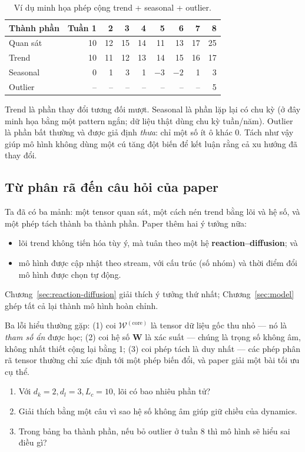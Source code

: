\begin{table}[htbp]
  \centering
  \small
  \caption{Ví dụ minh họa phép cộng trend + seasonal + outlier.}
  \label{tab:three-components}
  \begin{tabular}{lrrrrrrrr}
    \toprule
    Thành phần & Tuần 1 & 2 & 3 & 4 & 5 & 6 & 7 & 8 \\
    \midrule
    Quan sát      & 10 & 12 & 15 & 14 & 11 & 13 & 17 & 25 \\
    Trend         & 10 & 11 & 12 & 13 & 14 & 15 & 16 & 17 \\
    Seasonal      &  0 &  1 &  3 &  1 & $-3$ & $-2$ &  1 &  3 \\
    Outlier       &  -- & -- & -- & -- & -- & -- & -- &  5 \\
    \bottomrule
  \end{tabular}
\end{table}

Trend là phần thay đổi tương đối mượt. Seasonal là phần lặp lại có chu kỳ (ở đây minh họa bằng
một pattern ngắn; dữ liệu thật dùng chu kỳ tuần/năm). Outlier là phần bất thường và được giả định
\emph{thưa}: chỉ một số ít ô khác 0. Tách như vậy giúp mô hình không dùng một cú tăng đột biến
để kết luận rằng cả xu hướng đã thay đổi.

\subsection{Từ phân rã đến câu hỏi của paper}

Ta đã có ba mảnh: một tensor quan sát, một cách nén trend bằng lõi và hệ số, và một phép tách
thành ba thành phần. Paper thêm hai ý tưởng nữa:
\begin{itemize}
  \item lõi trend không tiến hóa tùy ý, mà tuân theo một hệ \textbf{reaction--diffusion}; và
  \item mô hình được cập nhật theo stream, với cấu trúc (số nhóm) và thời điểm đổi mô hình được
        chọn tự động.
\end{itemize}
Chương~\ref{sec:reaction-diffusion} giải thích ý tưởng thứ nhất; Chương~\ref{sec:model} ghép tất
cả lại thành mô hình hoàn chỉnh.

\begin{commonmistake}
Ba lỗi hiểu thường gặp: (1) coi $\mathcal{W}^{(\mathrm{core})}$ là tensor dữ liệu gốc thu nhỏ ---
nó là \emph{tham số ẩn} được học; (2) coi hệ số $\mathbf{W}$ là xác suất --- chúng là trọng số
không âm, không nhất thiết cộng lại bằng 1; (3) coi phép tách là duy nhất --- các phép phân rã
tensor thường chỉ xác định tới một phép biến đổi, và paper giải một bài tối ưu cụ thể.
\end{commonmistake}

\begin{selfcheck}
\begin{enumerate}
  \item Với $d_k=2,d_l=3,L_c=10$, lõi có bao nhiêu phần tử?
  \item Giải thích bằng một câu vì sao hệ số không âm giúp giữ chiều của dynamics.
  \item Trong bảng ba thành phần, nếu bỏ outlier ở tuần 8 thì mô hình sẽ hiểu sai điều gì?
\end{enumerate}
\end{selfcheck}
